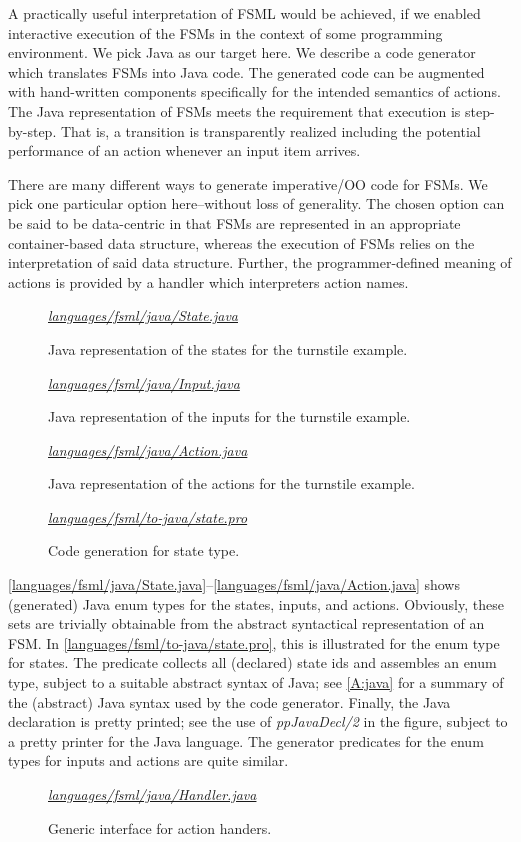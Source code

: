 \documentclass[preprint,authoryear,12pt]{noelsarticle}
\newcommand{\codefigure}[3]{
\begin{figure}[t!]
\begin{boxedminipage}{\hsize}
\mbox{}\hfill{}{\small\textit{\href{http://github.com/slebok/slepro/tree/master/#2}{#2}}}

\end{boxedminipage}
\caption{#1.}
\label{#2}
\medskip
\end{figure}}
\begin{document}
A practically useful interpretation of FSML would be achieved, if we
enabled interactive execution of the FSMs in the context of some
programming environment. We pick Java as our target here. We describe
a code generator which translates FSMs into Java code. The generated
code can be augmented with hand-written components specifically for
the intended semantics of actions. The Java representation of FSMs
meets the requirement that execution is step-by-step. That is, a
transition is transparently realized including the potential
performance of an action whenever an input item arrives.

There are many different ways to generate imperative/OO code for
FSMs. We pick one particular option here--without loss of
generality. The chosen option can be said to be data-centric in that
FSMs are represented in an appropriate container-based data structure,
whereas the execution of FSMs relies on the interpretation of said
data structure. Further, the programmer-defined meaning of actions is
provided by a handler which interpreters action names.

\codefigure{%
Java representation of the states for the turnstile example}{%
languages/fsml/java/State.java}{%
java}

\codefigure{%
Java representation of the inputs for the turnstile example}{%
languages/fsml/java/Input.java}{%
java}

\codefigure{%
Java representation of the actions for the turnstile example}{%
languages/fsml/java/Action.java}{%
java}

\codefigure{%
Code generation for state type}{%
languages/fsml/to-java/state.pro}{%
prolog}

\autoref{languages/fsml/java/State.java}--\autoref{languages/fsml/java/Action.java}
shows (generated) Java enum types for the states, inputs, and
actions. Obviously, these sets are trivially obtainable from the
abstract syntactical representation of an FSM. In
\autoref{languages/fsml/to-java/state.pro}, this is illustrated for
the enum type for states. The predicate collects all (declared) state
ids and assembles an enum type, subject to a suitable abstract syntax
of Java; see \ref{A:java} for a summary of the (abstract) Java
syntax used by the code generator. Finally, the Java declaration is
pretty printed; see the use of \emph{ppJavaDecl/2} in the figure,
subject to a pretty printer for the Java language. The generator
predicates for the enum types for inputs and actions are quite
similar.

\codefigure{%
Generic interface for action handers}{%
languages/fsml/java/Handler.java}{%
java}
\end{document}
